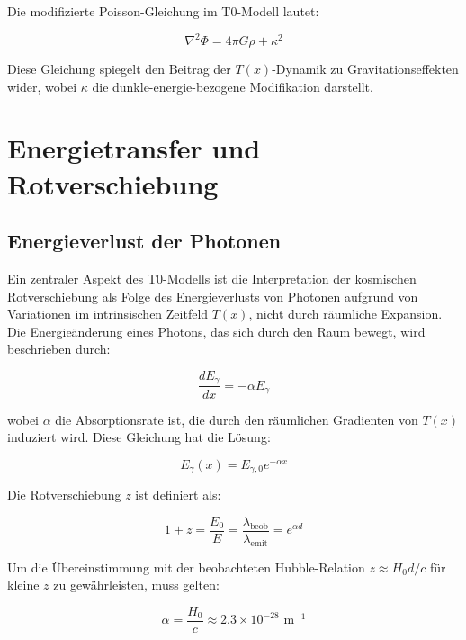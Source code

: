 \documentclass[a4paper,12pt]{article}
\theoremstyle{definition}
\theoremstyle{remark}
\newcommand{\Tfield}{T(x)} %
\begin{document}
	Die modifizierte Poisson-Gleichung im T0-Modell lautet:
	
	\begin{equation}
		\nabla^2 \Phi = 4\pi G \rho + \kappa^2
	\end{equation}
	
	Diese Gleichung spiegelt den Beitrag der \(\Tfield\)-Dynamik zu Gravitationseffekten wider, wobei \(\kappa\) die dunkle-energie-bezogene Modifikation darstellt.
	
	\section{Energietransfer und Rotverschiebung}
	
	\subsection{Energieverlust der Photonen}
	
	Ein zentraler Aspekt des T0-Modells ist die Interpretation der kosmischen Rotverschiebung als Folge des Energieverlusts von Photonen aufgrund von Variationen im intrinsischen Zeitfeld \(\Tfield\), nicht durch räumliche Expansion. Die Energieänderung eines Photons, das sich durch den Raum bewegt, wird beschrieben durch:
	
	\begin{equation}
		\frac{dE_{\gamma}}{dx} = -\alpha E_{\gamma}
	\end{equation}
	
	wobei \(\alpha\) die Absorptionsrate ist, die durch den räumlichen Gradienten von \(\Tfield\) induziert wird. Diese Gleichung hat die Lösung:
	
	\begin{equation}
		E_{\gamma}(x) = E_{\gamma,0} e^{-\alpha x}
	\end{equation}
	
	Die Rotverschiebung \(z\) ist definiert als:
	
	\begin{equation}
		1 + z = \frac{E_0}{E} = \frac{\lambda_{\text{beob}}}{\lambda_{\text{emit}}} = e^{\alpha d}
	\end{equation}
	
	Um die Übereinstimmung mit der beobachteten Hubble-Relation \(z \approx H_0 d/c\) für kleine \(z\) zu gewährleisten, muss gelten:
	
	\begin{equation}
		\alpha = \frac{H_0}{c} \approx 2.3 \times 10^{-28} \text{ m}^{-1}
	\end{equation}
	
\end{document}
